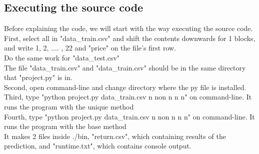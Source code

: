 \documentclass{article}
\begin{document}
\subsection{Executing the source code}
Before explaining the code, we will start with the way executing the source code.\\
First, select all in "data\_train.csv" and shift the contents downwards for 1 blocks, and write 1, 2, .... , 22 and "price" on the file's first row. \\
Do the same work for "data\_test.csv"\\
The file "data\_train.csv" and "data\_train.csv" should be in the same directory that "project.py" is in.\\
Second, open command-line and change directory where the py file is installed. \\
Third, type "python project.py data\_train.csv n non n n n" on command-line. It runs the program with the unique method\\
Fourth, type "python project.py data\_train.csv n non n n n" on command-line. It runs the program with the base method\\
It makes 2 files inside ./bin, "return.csv", which containing results of the prediction, and "runtime.txt", which contains console output.\\
\end{document}
